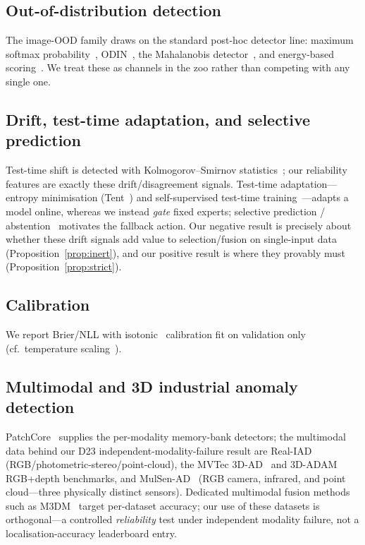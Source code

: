 \documentclass[10pt,conference]{IEEEtran}
\begin{document}
\subsection{Out-of-distribution detection}
The image-OOD family draws on the standard post-hoc detector line: maximum softmax
probability~\cite{msp}, ODIN~\cite{odin}, the Mahalanobis detector~\cite{mahalanobis},
and energy-based scoring~\cite{energyood}. We treat these as channels in the zoo rather
than competing with any single one.

\subsection{Drift, test-time adaptation, and selective prediction}
Test-time shift is detected with Kolmogorov--Smirnov statistics~\cite{driftsurvey}; our
reliability features are exactly these drift/disagreement signals. Test-time
adaptation---entropy minimisation (Tent~\cite{tent}) and self-supervised test-time
training~\cite{ttt}---adapts a model online, whereas we instead \emph{gate} fixed experts;
selective prediction / abstention~\cite{selective} motivates the fallback action. Our
negative result is precisely about whether these drift signals add value to
selection/fusion on single-input data (Proposition~\ref{prop:inert}), and our positive
result is where they provably must (Proposition~\ref{prop:strict}).

\subsection{Calibration}
We report Brier/NLL with isotonic~\cite{isotonic} calibration fit on validation only
(cf.\ temperature scaling~\cite{calibration}).

\subsection{Multimodal and 3D industrial anomaly detection}
PatchCore~\cite{patchcore} supplies the per-modality memory-bank detectors; the
multimodal data behind our D23 independent-modality-failure result are
Real-IAD~\cite{realiad} (RGB/photometric-stereo/point-cloud), the MVTec
3D-AD~\cite{mvtec3d} and 3D-ADAM RGB+depth benchmarks, and MulSen-AD~\cite{mulsen}
(RGB camera, infrared, and point cloud---three physically distinct sensors). Dedicated
multimodal fusion methods such as M3DM~\cite{m3dm} target per-dataset accuracy; our use
of these datasets is orthogonal---a controlled \emph{reliability} test under
independent modality failure, not a localisation-accuracy leaderboard entry.
\end{document}
